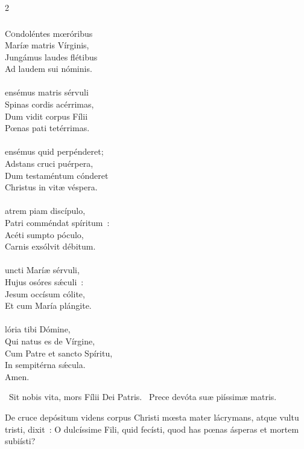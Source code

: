 \documentclass[9pt,twoside]{extarticle}
\begin{document}
\begin{multicols}{2}
\subsubsection*{\center {}}
\lettrine{C}ondoléntes mœróribus\\
Maríæ matris Vírginis,\\
Jungámus laudes flétibus\\
Ad laudem sui nóminis.\\
\\
ensémus matris sérvuli\\
Spinas cordis acérrimas,\\
Dum vidit corpus Fílii\\
Pœnas pati tetérrimas.\\
\\
ensémus quid perpénderet;\\
Adstans cruci puérpera,\\
Dum testaméntum cónderet\\
Christus in vitæ véspera.\\
\\
atrem piam discípulo,\\
Patri comméndat spíritum~:\\
Acéti sumpto póculo,\\
Carnis exsólvit débitum.\\
\\
uncti Maríæ sérvuli,\\
Hujus osóres sǽculi~:\\
Jesum occísum cólite,\\
Et cum María plángite.\\
\\
lória tibi Dómine,\\
Qui natus es de Vírgine,\\
Cum Patre et sancto Spíritu,\\
In sempitérna sǽcula.\\
Amen.

\begin{tightlist}{}
\item {}~Sit nobis vita, mors Fílii Dei Patris. ~Prece devóta suæ piíssimæ matris.
\item {} De cruce depósitum videns corpus Christi mœsta mater lácrymans, atque vultu tristi, dixit~: O dulcíssime Fili, quid fecísti, quod has pœnas ásperas et mortem subiísti?
\end{tightlist}


\end{multicols}
\end{document}
